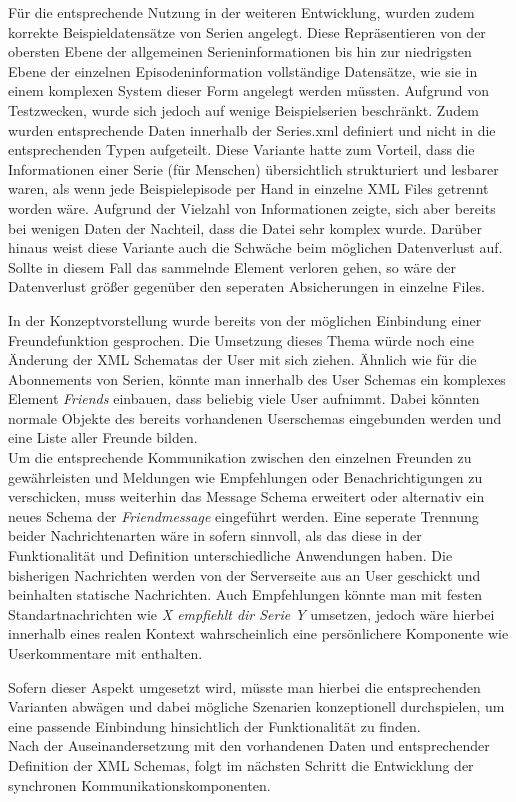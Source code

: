 \documentclass[a4paper]{article}
\begin{document}
Für die entsprechende Nutzung in der weiteren Entwicklung, wurden zudem korrekte Beispieldatensätze von Serien angelegt. Diese Repräsentieren von der obersten Ebene der allgemeinen Serieninformationen bis hin zur niedrigsten Ebene der einzelnen Episodeninformation vollständige Datensätze, wie sie in einem komplexen System dieser Form angelegt werden müssten. Aufgrund von Testzwecken, wurde sich jedoch auf wenige Beispielserien beschränkt. Zudem wurden entsprechende Daten innerhalb der Series.xml definiert und nicht in die entsprechenden Typen aufgeteilt. Diese Variante hatte zum Vorteil, dass die Informationen einer Serie (für Menschen) übersichtlich strukturiert und lesbarer waren, als wenn jede Beispielepisode per Hand in einzelne XML Files getrennt worden wäre.
Aufgrund der Vielzahl von Informationen zeigte, sich aber bereits bei wenigen Daten der Nachteil, dass die Datei sehr komplex wurde. Darüber hinaus weist diese Variante auch die Schwäche beim möglichen Datenverlust auf. Sollte in diesem Fall das sammelnde Element verloren gehen, so wäre der Datenverlust größer gegenüber den seperaten Absicherungen in einzelne Files.


\parskip 12pt
\parindent 0pt
In der Konzeptvorstellung wurde bereits von der möglichen Einbindung einer Freundefunktion gesprochen. Die Umsetzung dieses Thema würde noch eine Änderung der XML Schematas der User mit sich ziehen. Ähnlich wie für die Abonnements von Serien, könnte man innerhalb des User Schemas ein komplexes Element \textit{Friends} einbauen, dass beliebig viele User aufnimmt. Dabei könnten normale Objekte des bereits vorhandenen Userschemas eingebunden werden und eine Liste aller Freunde bilden.\\ Um die entsprechende Kommunikation zwischen den einzelnen Freunden zu gewährleisten und Meldungen wie Empfehlungen oder Benachrichtigungen zu verschicken, muss weiterhin das Message Schema erweitert oder alternativ ein neues Schema der \textit{Friendmessage} eingeführt werden. Eine seperate Trennung beider Nachrichtenarten wäre in sofern sinnvoll, als das diese in der Funktionalität und Definition unterschiedliche Anwendungen haben. Die bisherigen Nachrichten werden von der Serverseite aus an User geschickt und beinhalten statische Nachrichten. Auch Empfehlungen könnte man mit festen Standartnachrichten wie \textit{X empfiehlt dir Serie Y} umsetzen, jedoch wäre hierbei innerhalb eines realen Kontext wahrscheinlich eine persönlichere Komponente wie Userkommentare mit enthalten.


\parskip 12pt
\parindent 0pt
Sofern dieser Aspekt umgesetzt wird, müsste man hierbei die entsprechenden Varianten abwägen und dabei mögliche Szenarien konzeptionell durchspielen, um eine passende Einbindung hinsichtlich der Funktionalität zu finden.\\
Nach der Auseinandersetzung mit den vorhandenen Daten und entsprechender Definition der XML Schemas, folgt im nächsten Schritt die Entwicklung der synchronen Kommunikationskomponenten.
\end{document}

